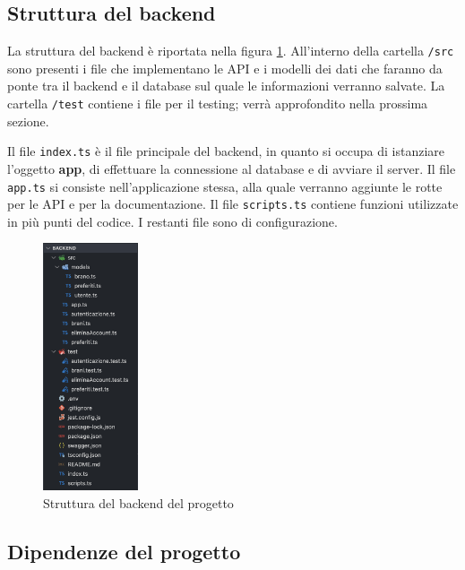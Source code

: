 \documentclass[a4paper,12pt]{article}
\begin{document}
\subsection{Struttura del backend}

La struttura del backend è riportata nella figura \ref{struttura-backend}. All'interno della cartella \texttt{/src} sono presenti i file che implementano le API e i modelli dei dati che faranno da ponte tra il backend e il database sul quale le informazioni verranno salvate. La cartella \texttt{/test} contiene i file per il testing; verrà approfondito nella prossima sezione.

Il file \texttt{index.ts} è il file principale del backend, in quanto si occupa di istanziare l'oggetto \textbf{app}, di effettuare la connessione al database e di avviare il server. Il file \texttt{app.ts} si consiste nell'applicazione stessa, alla quale verranno aggiunte le rotte per le API e per la documentazione. Il file \texttt{scripts.ts} contiene funzioni utilizzate in più punti del codice. I restanti file sono di configurazione.

\begin{figure}[htp]
    \centering
    \includegraphics[width=0.25\textwidth]{code/struttura-backend.png}
    \caption{Struttura del backend del progetto}
    \label{struttura-backend}
\end{figure}

\subsection{Dipendenze del progetto}
\end{document}
